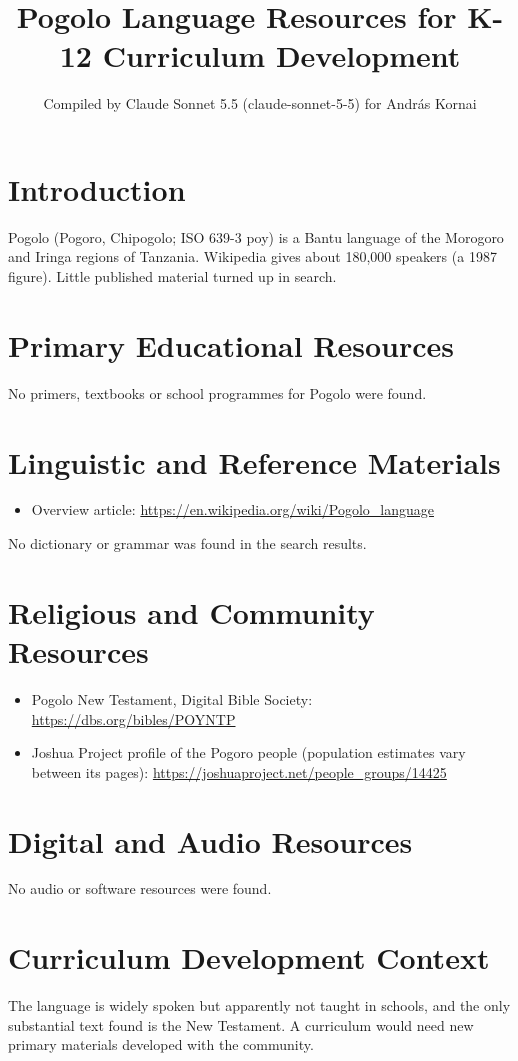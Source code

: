 \documentclass[12pt]{article}
\title{Pogolo Language Resources for K-12 Curriculum Development}
\author{Compiled by Claude Sonnet 5.5 (claude-sonnet-5-5) for Andr\'as Kornai}
\date{}
\begin{document}
\maketitle

\section{Introduction}
Pogolo (Pogoro, Chipogolo; ISO 639-3 poy) is a Bantu language of the Morogoro and Iringa regions of Tanzania. Wikipedia gives about 180,000 speakers (a 1987 figure). Little published material turned up in search.

\section{Primary Educational Resources}
No primers, textbooks or school programmes for Pogolo were found.

\section{Linguistic and Reference Materials}
\begin{itemize}
\item Overview article: \url{https://en.wikipedia.org/wiki/Pogolo_language}
\end{itemize}
No dictionary or grammar was found in the search results.

\section{Religious and Community Resources}
\begin{itemize}
\item Pogolo New Testament, Digital Bible Society: \url{https://dbs.org/bibles/POYNTP}
\item Joshua Project profile of the Pogoro people (population estimates vary between its pages): \url{https://joshuaproject.net/people_groups/14425}
\end{itemize}

\section{Digital and Audio Resources}
No audio or software resources were found.

\section{Curriculum Development Context}
The language is widely spoken but apparently not taught in schools, and the only substantial text found is the New Testament. A curriculum would need new primary materials developed with the community.
\end{document}

